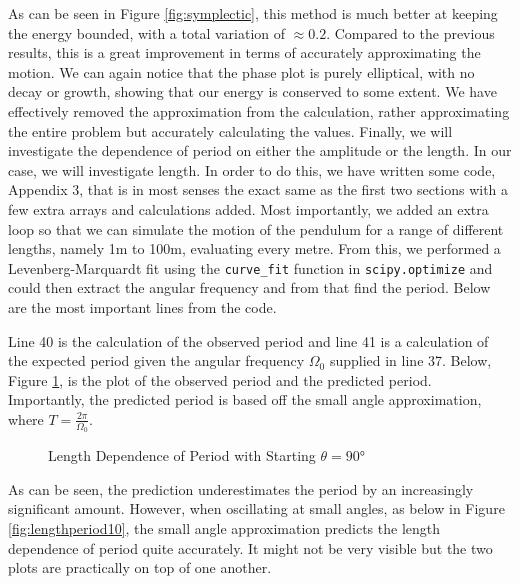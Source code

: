 \documentclass[12pt]{article}
\begin{document}
    \noindent
    As can be seen in Figure \ref{fig:symplectic}, this method is much better at keeping the 
    energy bounded, with a total variation of $\approx 0.2$. Compared to the previous results, 
    this is a great improvement in terms of accurately approximating the motion. We can again 
    notice that the phase plot is purely elliptical, with no decay or growth, showing that our 
    energy is conserved to some extent. We have effectively removed the approximation from the 
    calculation, rather approximating the entire problem but accurately calculating the values. 
    \newline
    \newline
    Finally, we will investigate the dependence of period on either the amplitude or the length. 
    In our case, we will investigate length. In order to do this, we have written some code, 
    Appendix 3, that is in most senses the exact same as the first two sections with a few extra 
    arrays and calculations added. Most importantly, we added an extra loop so that we can simulate 
    the motion of the pendulum for a range of different lengths, namely 1m to 100m, evaluating every 
    metre. From this, we performed a Levenberg-Marquardt fit using the \texttt{curve\_fit} function 
    in \texttt{scipy.optimize} and could then extract the angular frequency and from that find the 
    period. Below are the most important lines from the code.
    \newline
    
    
    \noindent
    Line 40 is the calculation of the observed period and line 41 is a calculation of the expected 
    period given the angular frequency $\Omega_0$ supplied in line 37. Below, Figure \ref{fig:lengthperiod90}, 
    is the plot of the observed period and the predicted period. Importantly, the predicted period is 
    based off the small angle approximation, where $T = \frac{2\pi}{\Omega_0}$.

    \begin{figure}[H]
        \begin{center}
           \scalebox{.7}{}
           \caption{Length Dependence of Period with Starting $\theta = \ang{90}$}
           \label{fig:lengthperiod90}
        \end{center}
    \end{figure}

    \noindent
    As can be seen, the prediction underestimates the period by an increasingly significant amount. 
    However, when oscillating at small angles, as below in Figure \ref{fig:lengthperiod10}, the 
    small angle approximation predicts the length dependence of period quite accurately. It might not 
    be very visible but the two plots are practically on top of one another.
\end{document}
